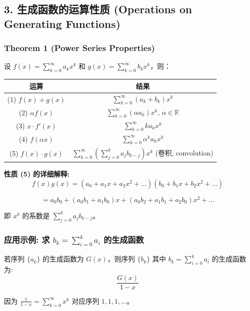 \documentclass[10pt,a4paper,openany]{ctexbook}
\theoremstyle{definition}
\theoremstyle{remark}
\begin{document}
\vspace{-2pt}

\subsection{3. 生成函数的运算性质 (Operations on Generating Functions)}

\subsubsection{Theorem 1 (Power Series Properties)}

设 $f(x) = \sum_{k=0}^\infty a_k x^k$ 和 $g(x) = \sum_{k=0}^\infty b_k x^k$，则：
\begin{center}
\begin{tabular}{cc}
\hline
运算 & 结果 \\ \hline
(1) $f(x) + g(x)$ & $\sum_{k=0}^\infty (a_k + b_k) x^k$ \\
(2) $\alpha f(x)$ & $\sum_{k=0}^\infty (\alpha a_k) x^k$, $\alpha \in \mathbb{R}$ \\
(3) $x \cdot f'(x)$ & $\sum_{k=0}^\infty k a_k x^k$ \\
(4) $f(\alpha x)$ & $\sum_{k=0}^\infty \alpha^k a_k x^k$ \\
(5) $f(x) \cdot g(x)$ & $\sum_{k=0}^\infty \left(\sum_{j=0}^k a_j b_{k-j}\right) x^k$ (卷积, convolution) \\
\hline
\end{tabular}

\end{center}

\textbf{性质 (5) 的详细解释:}
\[
f(x)g(x) = (a_0 + a_1 x + a_2 x^2 + \dots)(b_0 + b_1 x + b_2 x^2 + \dots)
\]

\[
= a_0 b_0 + (a_0 b_1 + a_1 b_0)x + (a_0 b_2 + a_1 b_1 + a_2 b_0)x^2 + \dots
\]

即 $x^k$ 的系数是 $\sum_{j=0}^k a_j b_{k-j}$。
\vspace{-2pt}

\subsubsection{应用示例: 求 $b_k = \sum_{i=0}^k a_i$ 的生成函数}

若序列 $\{a_k\}$ 的生成函数为 $G(x)$，则序列 $\{b_k\}$ 其中 $b_k = \sum_{i=0}^k a_i$ 的生成函数为:
\[
\frac{G(x)}{1-x}
\]

因为 $\frac{1}{1-x} = \sum_{k=0}^\infty x^k$ 对应序列 $1,1,1,\dots$。
\vspace{-2pt}
\end{document}
